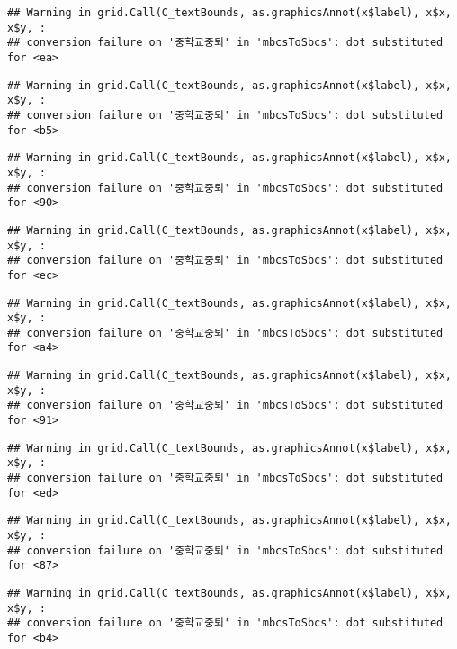 \documentclass[
]{article}
\begin{document}
\begin{verbatim}
## Warning in grid.Call(C_textBounds, as.graphicsAnnot(x$label), x$x, x$y, :
## conversion failure on '중학교중퇴' in 'mbcsToSbcs': dot substituted for <ea>
\end{verbatim}

\begin{verbatim}
## Warning in grid.Call(C_textBounds, as.graphicsAnnot(x$label), x$x, x$y, :
## conversion failure on '중학교중퇴' in 'mbcsToSbcs': dot substituted for <b5>
\end{verbatim}

\begin{verbatim}
## Warning in grid.Call(C_textBounds, as.graphicsAnnot(x$label), x$x, x$y, :
## conversion failure on '중학교중퇴' in 'mbcsToSbcs': dot substituted for <90>
\end{verbatim}

\begin{verbatim}
## Warning in grid.Call(C_textBounds, as.graphicsAnnot(x$label), x$x, x$y, :
## conversion failure on '중학교중퇴' in 'mbcsToSbcs': dot substituted for <ec>
\end{verbatim}

\begin{verbatim}
## Warning in grid.Call(C_textBounds, as.graphicsAnnot(x$label), x$x, x$y, :
## conversion failure on '중학교중퇴' in 'mbcsToSbcs': dot substituted for <a4>
\end{verbatim}

\begin{verbatim}
## Warning in grid.Call(C_textBounds, as.graphicsAnnot(x$label), x$x, x$y, :
## conversion failure on '중학교중퇴' in 'mbcsToSbcs': dot substituted for <91>
\end{verbatim}

\begin{verbatim}
## Warning in grid.Call(C_textBounds, as.graphicsAnnot(x$label), x$x, x$y, :
## conversion failure on '중학교중퇴' in 'mbcsToSbcs': dot substituted for <ed>
\end{verbatim}

\begin{verbatim}
## Warning in grid.Call(C_textBounds, as.graphicsAnnot(x$label), x$x, x$y, :
## conversion failure on '중학교중퇴' in 'mbcsToSbcs': dot substituted for <87>
\end{verbatim}

\begin{verbatim}
## Warning in grid.Call(C_textBounds, as.graphicsAnnot(x$label), x$x, x$y, :
## conversion failure on '중학교중퇴' in 'mbcsToSbcs': dot substituted for <b4>
\end{verbatim}
\end{document}
